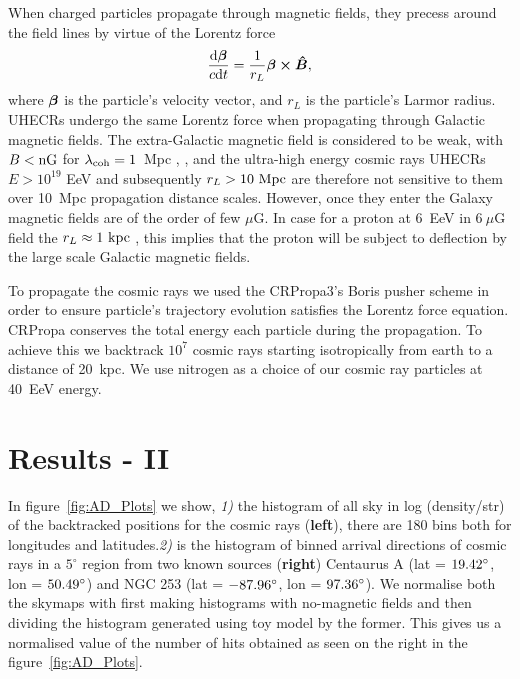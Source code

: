 \documentclass[12pt, a4 paper]{mnras}
\newcommand{\bfm}[1]{\mbox{\boldmath$ #1 $}}
\begin{document}
When charged particles propagate through magnetic fields, they precess around the field lines by virtue of the Lorentz force 
\begin{eqnarray}
\frac{{\rm d}\bfm{\beta}}{c{\rm d}t} = \frac{1}{r_{L}}\bfm{\beta}\cross \bfm{\hat{B}}, 
\end{eqnarray}
where $\bfm{\beta}$ is the particle's velocity vector, and $r_{L}$ is the particle's Larmor radius. UHECRs undergo the same Lorentz force when propagating through Galactic magnetic fields. The extra-Galactic magnetic field is considered to be weak, with $B < \rm {nG}$ for $\lambda_{\rm coh}=1$~Mpc \cite{Barrow_1997}, \cite{Kronberg_2007}, and the ultra-high energy cosmic rays UHECRs $E > 10^{19}$ EeV and subsequently $r_{L}>{\rm 10~Mpc}$ are therefore not sensitive to them over 10~Mpc propagation distance scales. However, once they enter the Galaxy magnetic fields are of the order of few $\mu$G. In case for a proton at 6~EeV in $6~\mu$G field the $r_L \approx 1 ~ \rm kpc$ , this implies that the proton will be subject to deflection by the large scale Galactic magnetic fields.

To propagate the cosmic rays we used the CRPropa3's \cite{CRPropa3_2016} Boris pusher scheme in order to ensure particle's trajectory evolution satisfies the Lorentz force equation. CRPropa conserves the total energy each particle during the propagation. 
To achieve this we backtrack $10^7$ cosmic rays starting isotropically from earth to a distance of 20~kpc. We use nitrogen as a choice of our cosmic ray particles at 40~EeV energy. 

\section{Results - II}
In figure~\ref{fig:AD_Plots} we show, \textit{1)} the histogram of all sky in log (density/str) of the backtracked positions for the cosmic rays (\textbf{left}), there are 180 bins both for longitudes and latitudes.\textit{2)} is the histogram of binned arrival directions of cosmic rays in a $5^{\circ}$ region from two known sources (\textbf{right}) Centaurus A (lat = $\rm 19.42^{\circ}$, lon = $\rm 50.49^{\circ}$) and NGC 253 (lat = $\rm -87.96^{\circ}$, lon = $\rm 97.36^{\circ}$).  We normalise both the skymaps with first making histograms with no-magnetic fields and then dividing the histogram generated using toy model by the former. This gives us a normalised value of the number of hits obtained as seen on the right in the figure~\ref{fig:AD_Plots}.
\end{document}
